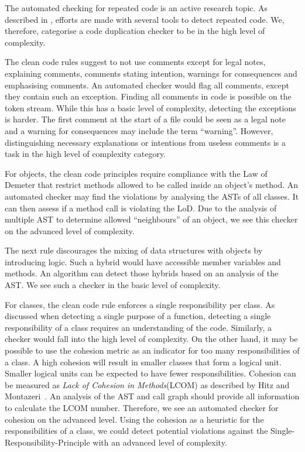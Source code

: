 The automated checking for repeated code is an active research topic. As described in , efforts are made with several tools to detect repeated code. We, therefore, categorise a code duplication checker to be in the high level of complexity.

The clean code rules suggest to not use comments except for legal notes, explaining comments, comments stating intention, warnings for consequences and emphasising comments. An automated checker would flag all comments, except they contain such an exception. Finding all comments in code is possible on the token stream. While this has a basic level of complexity, detecting the exceptions is harder. The first comment at the start of a file could be seen as a legal note and a warning for consequences may include the term \enquote{warning}. However, distinguishing necessary explanations or intentions from useless comments is a task in the high level of complexity category.

For objects, the clean code principles require compliance with the Law of Demeter that restrict methods allowed to be called inside an object's method. An automated checker may find the violations by analysing the ASTs of all classes. It can then assess if a method call is violating the LoD. Due to the analysis of multiple AST to determine allowed \enquote{neighbours} of an object, we see this checker on the advanced level of complexity.

The next rule discourages the mixing of data structures with objects by introducing logic. Such a hybrid would have accessible member variables and methods. An algorithm can detect those hybrids based on an analysis of the AST. We see such a checker in the basic level of complexity.

For classes, the clean code rule enforces a single responsibility per class. As discussed when detecting a single purpose of a function, detecting a single responsibility of a class requires an understanding of the code. Similarly, a checker would fall into the high level of complexity. On the other hand, it may be possible to use the cohesion metric as an indicator for too many responsibilities of a class. A high cohesion will result in smaller classes that form a logical unit. Smaller logical units can be expected to have fewer responsibilities. Cohesion can be measured as \textit{Lack of Cohesion in Methods}(LCOM) as described by Hitz and Montazeri~\cite{Hitz95measuringcoupling}. An analysis of the AST and call graph should provide all information to calculate the LCOM number. Therefore, we see an automated checker for cohesion on the advanced level. Using the cohesion as a heuristic for the responsibilities of a class, we could detect potential violations against the Single-Responsibility-Principle with an advanced level of complexity.

